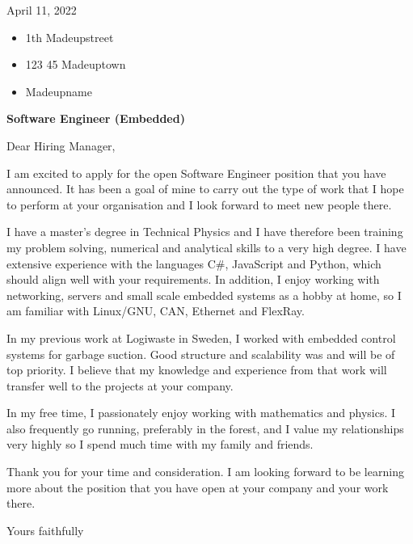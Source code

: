 April 11, 2022

\begin{itemize}
	\item 1th Madeupstreet
	\item 123 45 Madeuptown
	\item Madeupname
\end{itemize}

\bigskip

\textbf{Software Engineer (Embedded)}

Dear Hiring Manager,

I am excited to apply for the open Software Engineer position that you have announced. It has been a goal of mine to carry out the type of work that I hope to perform at your organisation and I look forward to meet new people there. 

I have a master's degree in Technical Physics and I have therefore been training my problem solving, numerical and analytical skills to a very high degree. I have extensive experience with the languages C\#, JavaScript and Python, which should align well with your requirements. In addition, I enjoy working with networking, servers and small scale embedded systems as a hobby at home, so I am familiar with Linux/GNU, CAN, Ethernet and FlexRay.

In my previous work at Logiwaste in Sweden, I worked with embedded control systems for garbage suction. Good structure and scalability was and will be of top priority. I believe that my knowledge and experience from that work will transfer well to the projects at your company.

In my free time, I passionately enjoy working with mathematics and physics. I also frequently go running, preferably in the forest, and I value my relationships very highly so I spend much time with my family and friends.

Thank you for your time and consideration. I am looking forward to be learning more about the position that you have open at your company and your work there.

Yours faithfully



































